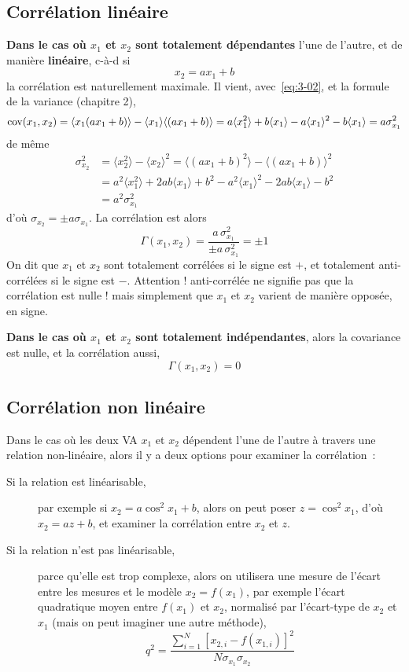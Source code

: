 \subsection{Corrélation linéaire}

\noindent\textbf{Dans le cas où $x_1$ et $x_2$ sont totalement dépendantes} l'une de l'autre, et de manière \textbf{linéaire}, c-à-d si
$$
x_2=ax_1+b
$$
la corrélation est naturellement maximale. Il vient, avec~\ref{eq:3-02}, et la formule de la variance (chapitre 2),
$$
\text{cov}(x_1,x_2)=\langle x_1(ax_1+b)\rangle-\langle x_1\rangle\langle(ax_1+b)\rangle
=a\langle x_1^2\rangle+b\langle x_1\rangle-a\langle x_1\rangle^2-b\langle x_1\rangle
=a\sigma_{x_1}^2
$$
de même
\begin{align*}
\sigma_{x_2}^2&=\langle x_2^2\rangle-\langle x_2\rangle^2=
\langle (ax_1+b)^2\rangle-\langle (ax_1+b)\rangle^2\\
&=a^2\langle x_1^2\rangle+2ab\langle x_1\rangle+b^2-a^2\langle x_1\rangle^2-2ab\langle x_1\rangle-b^2\\
&=a^2\sigma_{x_1}^2
\end{align*}
d'où $\sigma_{x_2}=\pm a\sigma_{x_1}$. La corrélation est alors
$$
\Gamma(x_1,x_2)=\frac{a\,\sigma_{x_1}^2}{\pm a\,\sigma_{x_1}^2}=\pm 1
$$
On dit que $x_1$ et $x_2$ sont totalement corrélées si le signe est $+$, et totalement anti-corrélées si le signe est $-$. Attention ! anti-corrélée ne signifie pas que la corrélation est nulle ! mais simplement que $x_1$ et $x_2$ varient de manière opposée, en signe.

\noindent\textbf{Dans le cas où $x_1$ et $x_2$ sont totalement indépendantes}, alors la covariance est nulle, et la corrélation aussi,
$$
\Gamma(x_1,x_2)=0
$$

\subsection{Corrélation non linéaire}

Dans le cas où les deux VA $x_1$ et $x_2$ dépendent l'une de l'autre à travers une relation non-linéaire, alors il y a deux options pour examiner la corrélation~:
\begin{description}
\item[Si la relation est linéarisable,] par exemple si $x_2=a\cos^2x_1+b$, alors on peut poser $z=\cos^2x_1$, d'où $x_2=az+b$, et examiner la corrélation entre $x_2$ et $z$.
\item[Si la relation n'est pas linéarisable,] parce qu'elle est trop complexe, alors on utilisera une mesure de l'écart entre les mesures et le modèle $x_2=f(x_1)$, par exemple l'écart quadratique moyen entre $f(x_1)$ et $x_2$, normalisé par l'écart-type de $x_2$ et $x_1$ (mais on peut imaginer une autre méthode),
$$
q^2=\frac{\sum_{i=1}^{N}\left[x_{2,i}-f(x_{1,i})\right]^2}{N\sigma_{x_1}\sigma_{x_2}}
$$
\end{description}

